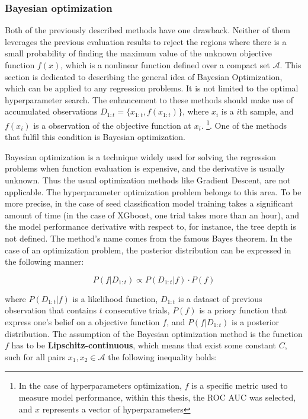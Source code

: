 \subsubsection{Bayesian optimization}
\label{sec:BayesOpt}
Both of the previously described methods have one drawback. Neither of them leverages the previous evaluation results to reject the regions where there is a small probability of finding the maximum value of the unknown objective function $f(x)$, which is a nonlinear function defined over a compact set $\mathcal{A}$. This section is dedicated to describing the general idea of Bayesian Optimization, which can be applied to any regression problems. It is not limited to the optimal hyperparameter search. The enhancement to these methods should make use of accumulated observations $D_{1:t} = \{ x_{1:t}, f(x_{1:t}) \}$, where $x_i$ is a $i$th sample, and $f(x_i)$ is a observation of the objective function at $x_i$.   \footnote{In the case of hyperparameters optimization, $f$ is a specific metric used to measure model performance, within this thesis, the ROC AUC was selected,  and $x$ represents a vector of hyperparameters }. One of the methods that fulfil this condition is Bayesian optimization.  
 
Bayesian optimization is a technique widely used for solving the regression problems when function evaluation is expensive, and the derivative is usually unknown. Thus the usual optimization methods like Gradient Descent, are not applicable. The hyperparameter optimization problem belongs to this area. To be more precise, in the case of seed classification model training takes a significant amount of time (in the case of XGboost, one trial takes more than an hour), and the model performance derivative with respect to, for instance, the tree depth is not defined.    
The method's name comes from the famous Bayes theorem. In the case of an optimization problem, the posterior distribution can be expressed in the following manner: 

\begin{equation}
\label{eq:BO_posteriori}
    P(f|D_{1:t}) \propto P(D_{1:t} | f) \cdot  P(f)
\end{equation}

where $ P(D_{1:t} | f)$ is a likelihood function, $D_{1:t}$ is a dataset of previous observation that contains $t$  consecutive trials, $P(f)$ is a priory function that express one's belief on a objective function $f$, and  $P(f|D_{1:t})$ is a posterior distribution. The assumption of the Bayesian optimization method is the function $f$ has to be \textbf{Lipschitz-continuous}, which means that exist some constant $C$, such for all pairs $x_1, x_2  \in \mathcal{A}$ the following inequality holds:

